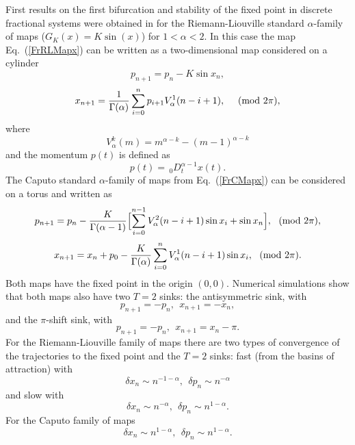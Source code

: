 \documentclass[graybox]{svmult}
\begin{document}
First results on the first bifurcation and stability of the fixed point in discrete fractional systems were obtained in \cite{ME2,ME1,ME5} for the Riemann-Liouville standard $\alpha$-family of maps ($G_K(x)=K \sin(x)$)  for $1<\alpha<2$. In this case the map Eq.~(\ref{FrRLMapx}) can be written as a two-dimensional map considered on a cylinder 
\begin{equation} \label{FSMRLp}
p_{n+1} = p_n - K \sin x_n ,
\end{equation}
\begin{equation} \label{FSMRLx}
x_{n+1} = \frac{1}{\Gamma (\alpha )} 
\sum_{i=0}^{n} p_{i+1}V^1_{\alpha}(n-i+1) 
, \ \ \ \ ({\rm mod} \ 2\pi ) ,
\end{equation}
where 
\begin{equation} \label{V1}
V^k_{\alpha}(m)=m^{\alpha -k}-(m-1)^{\alpha -k} 
\end{equation}
and the momentum $p(t)$ is defined as
\begin{equation} \label{MomRL}
p(t)= \, _0D^{\alpha-1}_t x(t).
\end{equation} 
The Caputo standard $\alpha$-family of maps from Eq.~(\ref{FrCMapx}) can be considered on a torus and written as
\begin{equation} \label{FSMCp}
p_{n+1} = p_n 
-\frac{K}{\Gamma (\alpha -1 )} 
\Bigl[ \sum_{i=0}^{n-1} V^2_{\alpha}(n-i+1) \sin x_i 
+ \sin x_n \Bigr],\ \ ({\rm mod} \ 2\pi ), 
\end{equation}
\begin{equation} \label{FSMCx}
x_{n+1} = x_n + p_0 
-\frac{K}{\Gamma (\alpha)} 
\sum_{i=0}^{n} V^1_{\alpha}(n-i+1) \sin x_i,\ \ ({\rm mod} \ 2\pi ). 
\end{equation}
Both maps have the fixed point in the origin $(0,0)$. 
Numerical simulations show that both maps also have two $T=2$ sinks:
the antisymmetric sink, with
\begin{equation} \label{T2point} 
p_{n+1} = -p_n, \    \  x_{n+1} = -x_n,
\end{equation}
and the $\pi$-shift sink, with 
\begin{equation} \label{T2pointN} 
p_{n+1} = -p_{n}, \    \  x_{n+1} = x_n-\pi.
\end{equation}
For the Riemann-Liouville family of maps
there are two types of convergence
of the trajectories to the fixed point and the $T=2$ sinks: fast (from the basins of attraction) with
\begin{equation} \label{FastConv} 
\delta x_n \sim n^{-1-\alpha}, \  \ \delta p_n
\sim n^{-\alpha}
\end{equation}
and slow with  
\begin{equation} \label{SlowConv}
\delta x_n \sim n^{-\alpha}, \  \  \delta p_n
\sim n^{1-\alpha}.
\end{equation} 
For the Caputo family of maps
\begin{equation} \label{CaputoConv}
\delta x_n \sim n^{1-\alpha}, \  \  \delta p_n
\sim n^{1-\alpha}. 
\end{equation}
\end{document}

